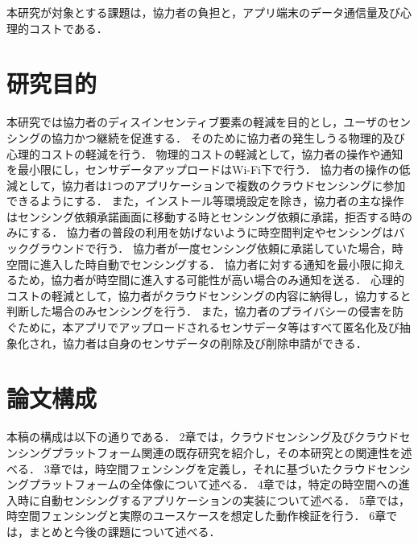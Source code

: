 本研究が対象とする課題は，協力者の負担と，アプリ端末のデータ通信量及び心理的コストである．


\section{研究目的}
\label{sec:thesis}

本研究では協力者のディスインセンティブ要素の軽減を目的とし，ユーザのセンシングの協力かつ継続を促進する．
そのために協力者の発生しうる物理的及び心理的コストの軽減を行う．
物理的コストの軽減として，協力者の操作や通知を最小限にし，センサデータアップロードはWi-Fi下で行う．
協力者の操作の低減として，協力者は1つのアプリケーションで複数のクラウドセンシングに参加できるようにする．
また，インストール等環境設定を除き，協力者の主な操作はセンシング依頼承諾画面に移動する時とセンシング依頼に承諾，拒否する時のみにする．
協力者の普段の利用を妨げないように時空間判定やセンシングはバックグラウンドで行う．
協力者が一度センシング依頼に承諾していた場合，時空間に進入した時自動でセンシングする．
協力者に対する通知を最小限に抑えるため，協力者が時空間に進入する可能性が高い場合のみ通知を送る．
心理的コストの軽減として，協力者がクラウドセンシングの内容に納得し，協力すると判断した場合のみセンシングを行う．
また，協力者のプライバシーの侵害を防ぐために，本アプリでアップロードされるセンサデータ等はすべて匿名化及び抽象化され，協力者は自身のセンサデータの削除及び削除申請ができる．


\section{論文構成}
\label{sec:presentation}

本稿の構成は以下の通りである．
2章では，クラウドセンシング及びクラウドセンシングプラットフォーム関連の既存研究を紹介し，その本研究との関連性を述べる．
3章では，時空間フェンシングを定義し，それに基づいたクラウドセンシングプラットフォームの全体像について述べる．
4章では，特定の時空間への進入時に自動センシングするアプリケーションの実装について述べる．
5章では，時空間フェンシングと実際のユースケースを想定した動作検証を行う．
6章では，まとめと今後の課題について述べる．


